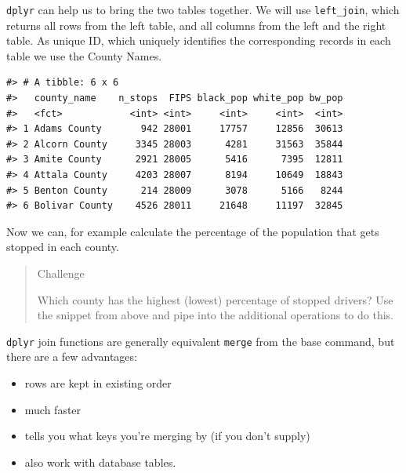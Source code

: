 \documentclass[]{book}
\newenvironment{Shaded}{\begin{snugshade}}{\end{snugshade}}
\newcommand{\DataTypeTok}[1]{\textcolor[rgb]{0.13,0.29,0.53}{#1}}
\newcommand{\KeywordTok}[1]{\textcolor[rgb]{0.13,0.29,0.53}{\textbf{#1}}}
\newcommand{\NormalTok}[1]{#1}
\newcommand{\OperatorTok}[1]{\textcolor[rgb]{0.81,0.36,0.00}{\textbf{#1}}}
\newcommand{\StringTok}[1]{\textcolor[rgb]{0.31,0.60,0.02}{#1}}
\providecommand{\tightlist}{%
  \setlength{\itemsep}{0pt}\setlength{\parskip}{0pt}}
\begin{document}
\texttt{dplyr} can help us to bring the two tables together. We will use \texttt{left\_join}, which returns all rows from the left table, and all columns from the left and the right table. As unique ID, which uniquely identifies the corresponding records in each table we use the County Names.

\begin{Shaded}
\end{Shaded}

\begin{verbatim}
#> # A tibble: 6 x 6
#>   county_name    n_stops  FIPS black_pop white_pop bw_pop
#>   <fct>            <int> <int>     <int>     <int>  <int>
#> 1 Adams County       942 28001     17757     12856  30613
#> 2 Alcorn County     3345 28003      4281     31563  35844
#> 3 Amite County      2921 28005      5416      7395  12811
#> 4 Attala County     4203 28007      8194     10649  18843
#> 5 Benton County      214 28009      3078      5166   8244
#> 6 Bolivar County    4526 28011     21648     11197  32845
\end{verbatim}

Now we can, for example calculate the percentage of the population that gets stopped in each county.

\begin{quote}
Challenge

Which county has the highest (lowest) percentage of stopped drivers?
Use the snippet from above and pipe into the additional operations
to do this.
\end{quote}

\texttt{dplyr} join functions are generally equivalent \texttt{merge} from the base command, but there are a few advantages:

\begin{itemize}
\tightlist
\item
  rows are kept in existing order
\item
  much faster
\item
  tells you what keys you're merging by (if you don't supply)
\item
  also work with database tables.
\end{itemize}
\end{document}
